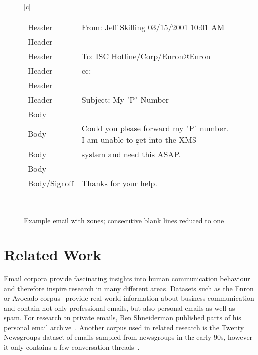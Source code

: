 \documentclass{llncs}
\begin{document}
\begin{figure}
\begin{tabular}{|c|}
{\begin{tabular*}{\textwidth}{l|l}
		Header         & From:  Jeff Skilling                           03/15/2001 10:01 AM \\
		Header         & \\
		Header         & To: ISC Hotline/Corp/Enron@Enron\\
		Header         & cc:\\
		Header         & \\
		Header         & Subject: My "P" Number\\\hline
		Body           & \\
		Body           & Could you please forward my "P" number.  I am unable to get into the XMS \\
		Body           & system and need this ASAP.\\
		Body           & \\
		Body/Signoff   & Thanks for your help.\\
	\end{tabular*}
}
	\\ 
	\hline 
\end{tabular} 
\caption{Example email with zones; consecutive blank lines reduced to one}
\label{fig:examplemail}
\end{figure}





\section{Related Work}

Email corpora provide fascinating insights into human communication behaviour and therefore inspire research in many different areas.
Datasets such as the Enron or Avocado corpus~\cite{avocado,enron} provide real world information about business communication and contain not only professional emails, but also personal emails as well as spam.
For research on private emails, Ben Shneiderman published parts of his personal email archive~\cite{shneiderman}.
Another corpus used in related research is the Twenty Newsgroups dataset of emails sampled from newsgroups in the early 90s, however it only contains a few conversation threads~\cite{20news}.
\end{document}
